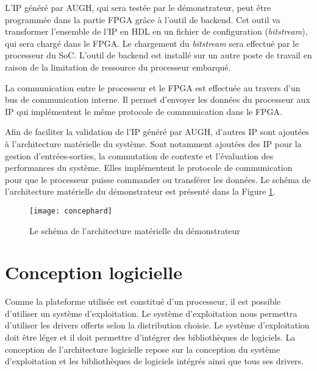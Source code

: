 L'IP généré par AUGH, qui sera testée par le démonstrateur, peut être programmée dans la partie FPGA grâce à l'outil de backend.
Cet outil va transformer l'ensemble de l'IP en HDL en un fichier de configuration (\emph{bitstream}), qui sera
chargé dans le FPGA. Le chargement du \emph{bitstream} sera effectué par le processeur du SoC.
L'outil de backend est installé sur un autre poste de travail en raison de la limitation de ressource du processeur embarqué.

La communication entre le processeur et le FPGA est effectuée au travers d'un bus de communication interne.
Il permet d'envoyer les données du processeur aux IP qui implémentent le même protocole de communication
dans le FPGA.

Afin de faciliter la validation de l'IP généré par AUGH, d'autres IP sont ajoutées à l'architecture matérielle du système.
Sont notamment ajoutées des IP pour la gestion d'entrées-sorties, la commutation de contexte et l'évaluation
des performances du système. Elles implémentent le protocole de communication pour que le processeur puisse
commander ou transférer les données.
Le schéma de l'architecture matérielle du démonstrateur est présenté
dans la Figure \ref{fig:concephard}.

\begin{figure}[h]
	\centering
	\texttt{[image: concephard]}
	\caption{Le schéma de l'architecture matérielle du démonstrateur}
	\label{fig:concephard}
	\vspace{-2mm}
\end{figure}

\section{Conception logicielle}
\label{sec:concepsoft}

Comme la plateforme utilisée est constitué d'un processeur, il est possible d'utiliser un système d'exploitation.
Le système d'exploitation nous permettra d'utiliser les drivers offerts selon la distribution choisie. 
Le système d'exploitation doit être léger et il doit permettre d'intégrer des bibliothèques de logiciels.
La conception de l'architecture logicielle repose sur la conception du système d'exploitation et les
bibliothèques de logiciels intégrés ainsi que tous ses drivers. 

